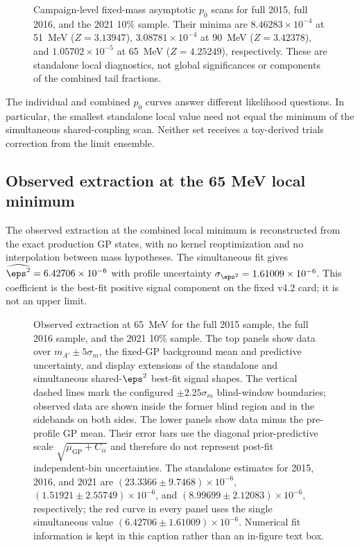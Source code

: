 \begin{figure}[H]
\centering
{}
\caption{Campaign-level fixed-mass asymptotic $p_0$ scans for full 2015, full
2016, and the 2021 10\% sample. Their minima are
$8.46283\times10^{-4}$ at 51~MeV ($Z=3.13947$),
$3.08781\times10^{-4}$ at 90~MeV ($Z=3.42378$), and
$1.05702\times10^{-5}$ at 65~MeV ($Z=4.25249$), respectively. These are
standalone local diagnostics, not global significances or components of the
combined tail fractions.}
\label{fig:results-v4p2-individual-p0}
\end{figure}

The individual and combined $p_0$ curves answer different likelihood questions.
In particular, the smallest standalone local value need not equal the minimum of
the simultaneous shared-coupling scan. Neither set receives a toy-derived trials
correction from the limit ensemble.

\subsection{Observed extraction at the 65 MeV local minimum}
\label{sec:results-v4p2-m065-extraction}

The observed extraction at the combined local minimum is reconstructed from the
exact production GP states, with no kernel reoptimization and no interpolation
between mass hypotheses. The simultaneous fit gives
$\widehat{\eps^2}=\VFourPTwoEpsHat$ with profile uncertainty
$\sigma_{\eps^2}=\VFourPTwoEpsHatSigma$. This coefficient is the best-fit
positive signal component on the fixed v4.2 card; it is not an upper limit.

\begin{figure}[H]
\centering
{}
\caption{Observed extraction at 65~MeV for the full 2015 sample, the full 2016
sample, and the 2021 10\% sample. The top panels show data over
$m_{A'}\pm5\sigma_m$, the fixed-GP background mean and predictive uncertainty,
and display extensions of the standalone and simultaneous shared-$\eps^2$
best-fit signal shapes. The vertical dashed lines mark the configured
$\pm2.25\sigma_m$ blind-window boundaries; observed data are shown inside the
former blind region and in the sidebands on both sides. The lower panels show
data minus the pre-profile GP mean. Their error bars use the diagonal
prior-predictive scale $\sqrt{\mu_{\mathrm{GP}}+C_{ii}}$ and therefore do not
represent post-fit independent-bin uncertainties. The standalone estimates for
2015, 2016, and 2021 are
$(23.3366\pm9.7468)\times10^{-6}$,
$(1.51921\pm2.55749)\times10^{-6}$, and
$(8.99699\pm2.12083)\times10^{-6}$, respectively; the red curve in every panel
uses the single simultaneous value
$(6.42706\pm1.61009)\times10^{-6}$. Numerical fit information is kept in this
caption rather than an in-figure text box.}
\label{fig:results-v4p2-m065-extraction}
\end{figure}

